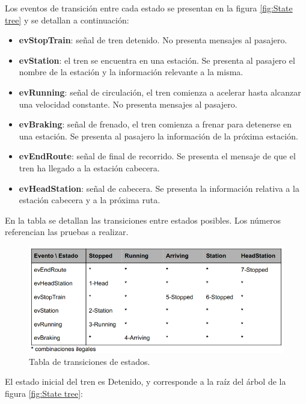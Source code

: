 \documentclass[
11pt, %
]{charter}
\begin{document}
Los eventos de transición entre cada estado se presentan en la figura \ref{fig:State tree} y se detallan a continuación:

\begin{itemize}
\item \textbf{evStopTrain}: señal de tren detenido. No presenta mensajes al pasajero.
\item \textbf{evStation}: el tren se encuentra en una estación. Se presenta al pasajero el nombre de
la estación y la información relevante a la misma.
\item \textbf{evRunning}: señal de circulación, el tren comienza a acelerar hasta alcanzar una
velocidad constante. No presenta mensajes al pasajero.
\item \textbf{evBraking}: señal de frenado, el tren comienza a frenar para detenerse en una estación.
Se presenta al pasajero la información de la próxima estación.
\item \textbf{evEndRoute}: señal de final de recorrido. Se presenta el mensaje de que el tren ha
llegado a la estación cabecera.
\item \textbf{evHeadStation}: señal de cabecera. Se presenta la información relativa a la estación cabecera y a la próxima ruta.
\end{itemize}

En la tabla se detallan las transiciones entre estados posibles. Los números referencian las pruebas a realizar.

\begin{figure}[htpb]
\centering 
\includegraphics[width=1\textwidth]{./Pics/TablaStatechart.1.png}
\caption{Tabla de transiciones de estados.}
\label{fig:State transition table}
\end{figure}

El estado inicial del tren es Detenido, y corresponde a la raíz del árbol de la figura \ref{fig:State tree}:
\end{document}
